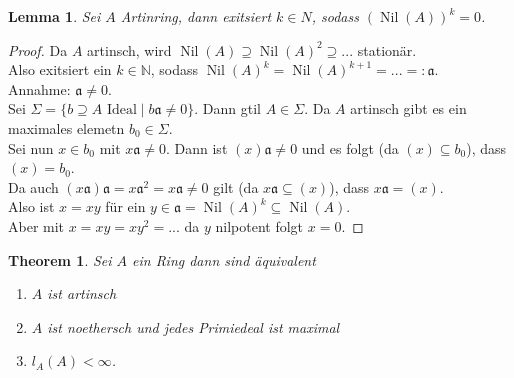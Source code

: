 \documentclass[10pt,a4paper]{article}
\newcommand{\N}{\ensuremath{\mathbb{N}}}
\newcommand{\Nil}{\ensuremath{\operatorname{Nil}}}
\newcounter{thm}[section]
\theoremstyle{definition}
\theoremstyle{plain}
\newtheorem{lem}[thm]{Lemma}
\newtheorem{theorem}[thm]{Theorem}
\theoremstyle{remark}
\begin{document}
\begin{lem}\label{525lem}
	Sei $A$ Artinring, dann exitsiert $k\in N$, sodass $(\Nil(A))^k=0$.
\end{lem}
\begin{proof}
	Da $A$ artinsch, wird $\Nil(A)\supseteq\Nil(A)^2\supseteq...$ stationär.\\
	Also exitsiert ein $k\in\N$, sodass $\Nil(A)^k=\Nil(A)^{k+1}=...=:\mathfrak a$.\\
	Annahme: $\mathfrak a\neq 0$.\\
	Sei $\Sigma=\{\text{$b\supseteq A$ Ideal}\mid b\mathfrak a\neq 0\}$. Dann gtil $A\in\Sigma$. Da $A$ artinsch gibt es ein maximales elemetn $b_0\in\Sigma$.\\
	Sei nun $x\in b_0$ mit $x\mathfrak a\neq 0$. Dann ist $(x)\mathfrak a\neq 0$ und es folgt (da $(x)\subseteq b_0$), dass $(x)=b_0$.\\
	Da auch $(x\mathfrak a)\mathfrak a=x\mathfrak a^2=x\mathfrak a\neq 0$ gilt (da $x\mathfrak a\subseteq(x)$), dass $x\mathfrak a=(x)$.\\
	Also ist $x=xy$ für ein $y\in\mathfrak a=\Nil(A)^k\subseteq\Nil(A)$.\\
	Aber mit $x=xy=xy^2=...$ da $y$ nilpotent folgt $x=0$.
\end{proof}
\begin{theorem}
	Sei $A$ ein Ring dann sind äquivalent\begin{enumerate}
		\item $A$ ist artinsch
		\item $A$ ist noethersch und jedes Primiedeal ist maximal
		\item $l_A(A)<\infty$.
	\end{enumerate}
\end{theorem}
\end{document}
